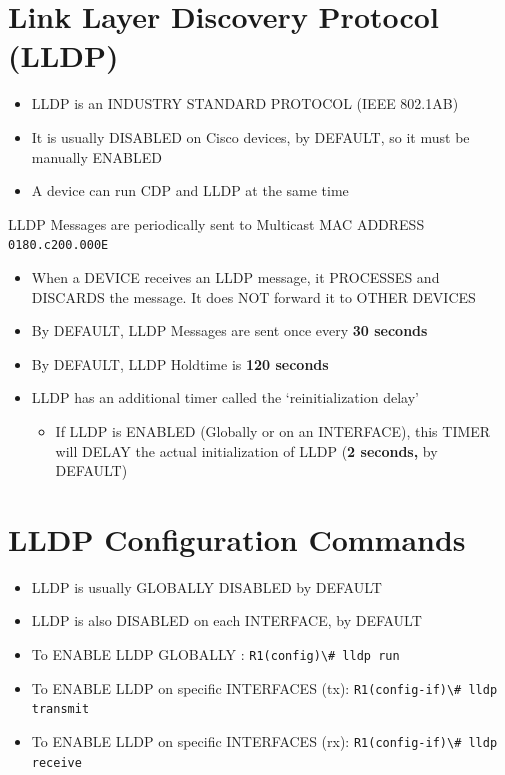 \section{Link Layer Discovery Protocol
(LLDP)}\label{link-layer-discovery-protocol-lldp}

\begin{itemize}
\tightlist
\item
  LLDP is an INDUSTRY STANDARD PROTOCOL (IEEE 802.1AB)
\item
  It is usually DISABLED on Cisco devices, by DEFAULT, so it must be
  manually ENABLED
\item
  A device can run CDP and LLDP at the same time
\end{itemize}

\begin{tipbox}

LLDP Messages are periodically sent to Multicast MAC ADDRESS
\passthrough{\lstinline!0180.c200.000E!}

\end{tipbox}

\begin{itemize}
\tightlist
\item
  When a DEVICE receives an LLDP message, it PROCESSES and DISCARDS the
  message. It does NOT forward it to OTHER DEVICES
\item
  By DEFAULT, LLDP Messages are sent once every \textbf{30 seconds}
\item
  By DEFAULT, LLDP Holdtime is \textbf{120 seconds}
\item
  LLDP has an additional timer called the `reinitialization delay'

  \begin{itemize}
  \tightlist
  \item
    If LLDP is ENABLED (Globally or on an INTERFACE), this TIMER will
    DELAY the actual initialization of LLDP (\textbf{2 seconds,} by
    DEFAULT)
  \end{itemize}
\end{itemize}

\section{LLDP Configuration Commands}\label{lldp-configuration-commands}

\begin{itemize}
\item
  LLDP is usually GLOBALLY DISABLED by DEFAULT
\item
  LLDP is also DISABLED on each INTERFACE, by DEFAULT
\item
  To ENABLE LLDP GLOBALLY :
  \passthrough{\lstinline!R1(config)\# lldp run!}
\item
  To ENABLE LLDP on specific INTERFACES (tx):
  \passthrough{\lstinline!R1(config-if)\# lldp transmit!}
\item
  To ENABLE LLDP on specific INTERFACES (rx):
  \passthrough{\lstinline!R1(config-if)\# lldp receive!}
\end{itemize}

